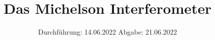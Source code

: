 

\subject{V401}
\title{Das Michelson Interferometer}
\date{
  Durchführung: 14.06.2022
  \hspace{3em}
  Abgabe: 21.06.2022
}



\maketitle
\thispagestyle{empty}
\tableofcontents
\newpage




\newpage





\printbibliography{}




